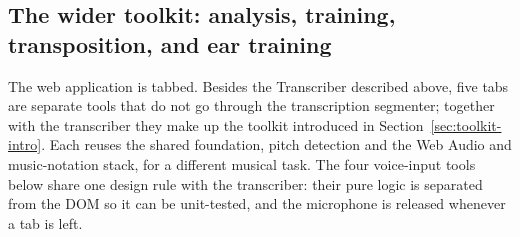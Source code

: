 \documentclass[12pt,a4paper]{article}
\begin{document}
\subsection{The wider toolkit: analysis, training, transposition, and ear
training}
\label{sec:toolkit}

The web application is tabbed. Besides the Transcriber described above, five tabs
are separate tools that do not go through the transcription segmenter; together
with the transcriber they make up the toolkit introduced in
Section~\ref{sec:toolkit-intro}. Each reuses the shared foundation, pitch
detection and the Web Audio and music-notation stack, for a different musical
task. The four voice-input tools below share one design rule with the
transcriber: their pure logic is separated from the DOM so it can be unit-tested,
and the microphone is released whenever a tab is left.
\end{document}
